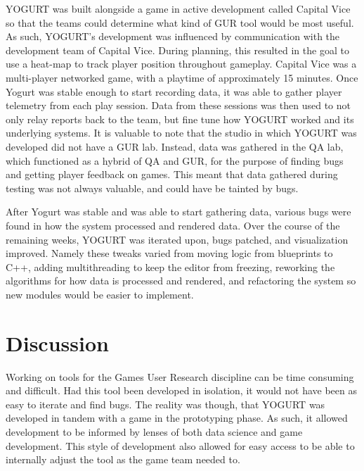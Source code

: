 \documentclass[journal]{IEEEtran}
\begin{document}
YOGURT was built alongside a game in active development called Capital Vice so that the teams could determine what kind of GUR tool would be most useful. As such, YOGURT's development was influenced by communication with the development team of Capital Vice. During planning, this resulted in the goal to use a heat-map to track player position throughout gameplay. Capital Vice was a multi-player networked game, with a playtime of approximately 15 minutes. Once Yogurt was stable enough to start recording data, it was able to gather player telemetry from each play session. Data from these sessions was then used to not only relay reports back to the team, but fine tune how YOGURT worked and its underlying systems. It is valuable to note that the studio in which YOGURT was developed did not have a GUR lab. Instead, data was gathered in the QA lab, which functioned as a hybrid of QA and GUR, for the purpose of finding bugs and getting player feedback on games. This meant that data gathered during testing was not always valuable, and could have be tainted by bugs.

After Yogurt was stable and was able to start gathering data, various bugs were found in how the system processed and rendered data. Over the course of the remaining weeks, YOGURT was iterated upon, bugs patched, and visualization improved. Namely these tweaks varied from moving logic from blueprints to C++, adding multithreading to keep the editor from freezing, reworking the algorithms for how data is processed and rendered, and refactoring the system so new modules would be easier to implement.

\section{Discussion}

Working on tools for the Games User Research discipline can be time consuming and difficult. Had this tool been developed in isolation, it would not have been as easy to iterate and find bugs. The reality was though, that YOGURT was developed in tandem with a game in the prototyping phase. As such, it allowed development to be informed by lenses of both data science and game development. This style of development also allowed for easy access to be able to internally adjust the tool as the game team needed to.
\end{document}

